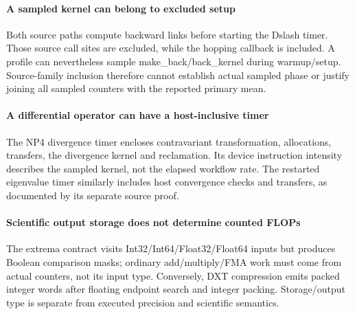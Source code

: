 \paragraph{A sampled kernel can belong to excluded setup} Both source paths compute backward links before starting the Dslash timer. Those source call sites are excluded, while the hopping callback is included. A profile can nevertheless sample make\_back/back\_kernel during warmup/setup. Source-family inclusion therefore cannot establish actual sampled phase or justify joining all sampled counters with the reported primary mean.

\paragraph{A differential operator can have a host-inclusive timer} The NP4 divergence timer encloses contravariant transformation, allocations, transfers, the divergence kernel and reclamation. Its device instruction intensity describes the sampled kernel, not the elapsed workflow rate. The restarted eigenvalue timer similarly includes host convergence checks and transfers, as documented by its separate source proof.

\paragraph{Scientific output storage does not determine counted FLOPs} The extrema contract visits Int32/Int64/Float32/Float64 inputs but produces Boolean comparison masks; ordinary add/multiply/FMA work must come from actual counters, not its input type. Conversely, DXT compression emits packed integer words after floating endpoint search and integer packing. Storage/output type is separate from executed precision and scientific semantics.
